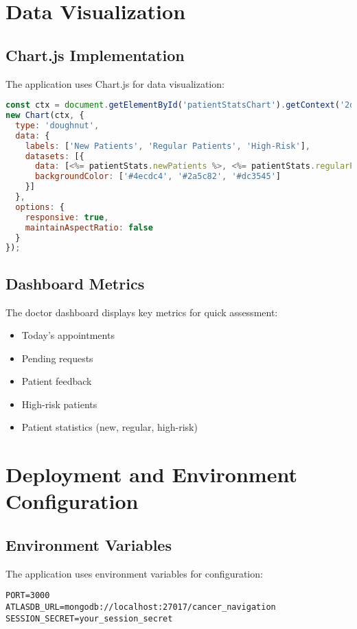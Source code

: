 \documentclass[12pt,a4paper]{report}
\begin{document}
\chapter{Data Visualization}

\section{Chart.js Implementation}
The application uses Chart.js for data visualization:

\begin{lstlisting}[language=JavaScript]
const ctx = document.getElementById('patientStatsChart').getContext('2d');
new Chart(ctx, {
  type: 'doughnut',
  data: {
    labels: ['New Patients', 'Regular Patients', 'High-Risk'],
    datasets: [{
      data: [<%= patientStats.newPatients %>, <%= patientStats.regularPatients %>, <%= patientStats.highRisk %>],
      backgroundColor: ['#4ecdc4', '#2a5c82', '#dc3545']
    }]
  },
  options: {
    responsive: true,
    maintainAspectRatio: false
  }
});
\end{lstlisting}

\section{Dashboard Metrics}
The doctor dashboard displays key metrics for quick assessment:

\begin{itemize}
    \item Today's appointments
    \item Pending requests
    \item Patient feedback
    \item High-risk patients
    \item Patient statistics (new, regular, high-risk)
\end{itemize}

\chapter{Deployment and Environment Configuration}

\section{Environment Variables}
The application uses environment variables for configuration:

\begin{lstlisting}
PORT=3000
ATLASDB_URL=mongodb://localhost:27017/cancer_navigation
SESSION_SECRET=your_session_secret
\end{lstlisting}
\end{document}
